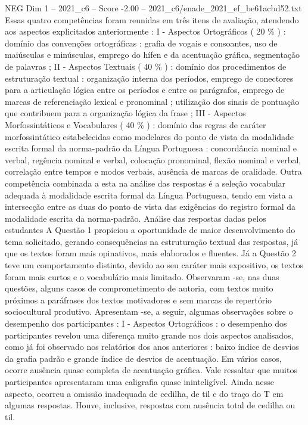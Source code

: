 \begin{textsample}{NEG Dim 1 – 2021\_c6 – Score -2.00 – 2021\_c6/enade\_2021\_ef\_be61acbd52.txt}
Essas quatro competências foram reunidas em três itens de avaliação, atendendo aos aspectos explicitados anteriormente : I - Aspectos Ortográficos ( 20 \% ) : domínio das convenções ortográficas : grafia de vogais e consoantes, uso de maiúsculas e minúsculas, emprego do hífen e da acentuação gráfica, segmentação de palavras ; II - Aspectos Textuais ( 40 \% ) : domínio dos procedimentos de estruturação textual : organização interna dos períodos, emprego de conectores para a articulação lógica entre os períodos e entre os parágrafos, emprego de marcas de referenciação lexical e pronominal ; utilização dos sinais de pontuação que contribuem para a organização lógica da frase ; III - Aspectos Morfossintáticos e Vocabulares ( 40 \% ) : domínio das regras de caráter morfossintático estabelecidas como modelares do ponto de vista da modalidade escrita formal da norma-padrão da Língua Portuguesa : concordância nominal e verbal, regência nominal e verbal, colocação pronominal, flexão nominal e verbal, correlação entre tempos e modos verbais, ausência de marcas de oralidade.
Outra competência combinada a esta na análise das respostas é a seleção vocabular adequada à modalidade escrita formal da Língua Portuguesa, tendo em vista a intersecção entre as duas do ponto de vista das exigências do registro formal da modalidade escrita da norma-padrão.
Análise das respostas dadas pelos estudantes A Questão 1 propiciou a oportunidade de maior desenvolvimento do tema solicitado, gerando consequências na estruturação textual das respostas, já que os textos foram mais opinativos, mais elaborados e fluentes.
Já a Questão 2 teve um comportamento distinto, devido ao seu caráter mais expositivo, os textos foram mais curtos e o vocabulário mais limitado.
Observaram -se, nas duas questões, alguns casos de comprometimento de autoria, com textos muito próximos a paráfrases dos textos motivadores e sem marcas de repertório sociocultural produtivo.
Apresentam -se, a seguir, algumas observações sobre o desempenho dos participantes : I - Aspectos Ortográficos : o desempenho dos participantes revelou uma diferença muito grande nos dois aspectos analisados, como já foi observado nos relatórios dos anos anteriores : baixo índice de desvios da grafia padrão e grande índice de desvios de acentuação.
Em vários casos, ocorre ausência quase completa de acentuação gráfica.
Vale ressaltar que muitos participantes apresentaram uma caligrafia quase ininteligível.
Ainda nesse aspecto, ocorreu a omissão inadequada de cedilha, de til e do traço do T em algumas respostas.
Houve, inclusive, respostas com ausência total de cedilha ou til.

\end{textsample}
